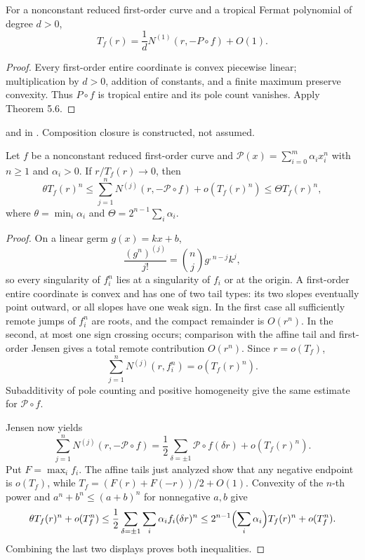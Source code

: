 \begin{corollary}
\leanok
{}
For a nonconstant reduced first-order curve and a tropical Fermat polynomial
of degree $d>0$,
\[
 T_f(r)=\frac1dN^{(1)}(r,-P\circ f)+O(1).
\]
\end{corollary}

\begin{proof}
\leanok
Every first-order entire coordinate is convex piecewise linear; multiplication
by $d>0$, addition of constants, and a finite maximum preserve convexity.
Thus $P\circ f$ is tropical entire and its pole count vanishes.  Apply
Theorem 5.6.
\end{proof}

\begin{leanproof}
 and
 in
.  Composition closure is constructed, not
assumed.
\end{leanproof}

\begin{theorem}
\leanok
{}
Let $f$ be a nonconstant reduced first-order curve and
$\mathcal P(x)=\sum_{i=0}^m\alpha_ix_i^n$ with $n\geq1$ and $\alpha_i>0$.
If $r/T_f(r)\to0$, then
\[
 \theta T_f(r)^n
 \leq \sum_{j=1}^nN^{(j)}(r,-\mathcal P\circ f)+o(T_f(r)^n)
 \leq \Theta T_f(r)^n,
\]
where $\theta=\min_i\alpha_i$ and
$\Theta=2^{n-1}\sum_i\alpha_i$.
\end{theorem}

\begin{proof}
\leanok
On a linear germ $g(x)=kx+b$,
\[
 \frac{(g^n)^{(j)}}{j!}=\binom njg^{,n-j}k^j,
\]
so every singularity of $f_i^n$ lies at a singularity of $f_i$ or at the
origin.  A first-order entire coordinate is convex and has one of two tail
types: its two slopes eventually point outward, or all slopes have one weak
sign.  In the first case all sufficiently remote jumps of $f_i^n$ are roots,
and the compact remainder is $O(r^n)$.  In the second, at most one sign
crossing occurs; comparison with the affine tail and first-order Jensen gives
a total remote contribution $O(r^n)$.  Since $r=o(T_f)$,
\[
                  \sum_{j=1}^nN^{(j)}(r,f_i^n)=o(T_f(r)^n).
\]
Subadditivity of pole counting and positive homogeneity give the same estimate
for $\mathcal P\circ f$.

Jensen now yields
\[
 \sum_{j=1}^nN^{(j)}(r,-\mathcal P\circ f)
 =\frac12\sum_{\delta=\pm1}\mathcal P\circ f(\delta r)
   +o(T_f(r)^n).
\]
Put $F=\max_i f_i$.  The affine tails just analyzed show that any negative
endpoint is $o(T_f)$, while
$T_f=(F(r)+F(-r))/2+O(1)$.  Convexity of the $n$-th power and
$a^n+b^n\leq(a+b)^n$ for nonnegative $a,b$ give
\[
 \theta T_f(r)^n+o(T_f^n)
 \leq\frac12\sum_{\delta=\pm1}\sum_i\alpha_i f_i(\delta r)^n
 \leq2^{n-1}\Bigl(\sum_i\alpha_i\Bigr)T_f(r)^n+o(T_f^n).
\]
Combining the last two displays proves both inequalities.
\end{proof}

